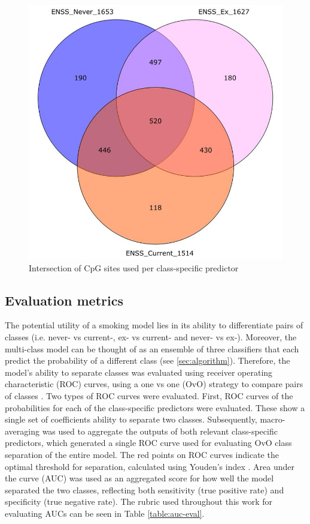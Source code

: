 \documentclass{article} %
\begin{document}
\begin{figure}[tb]
    \centering
    \includegraphics[width=0.6\linewidth]{venn_diagrams/predictor_intersect_placeholder.png}
    \caption[Model CpG site intersections]{Intersection of CpG sites used per class-specific predictor}
    \label{fig:cpg-intersection-internal}
\end{figure}

\subsection{Evaluation metrics}
The potential utility of a smoking model lies in its ability to differentiate pairs of classes (i.e. never- vs current-, ex- vs current- and never- vs ex-). Moreover, the multi-class model can be thought of as an ensemble of three classifiers that each predict the probability of a different class (see \ref{sec:algorithm}). Therefore, the model's ability to separate classes was evaluated using receiver operating characteristic (ROC) curves, using a one vs one (OvO) strategy to compare pairs of classes \cite{scikit-learn-roc-example}. Two types of ROC curves were evaluated. First, ROC curves of the probabilities for each of the class-specific predictors were evaluated. These show a single set of coefficients ability to separate two classes. Subsequently, macro-averaging \cite{scikit-learn-roc-example} was used to aggregate the outputs of both relevant class-specific predictors, which generated a single ROC curve used for evaluating OvO class separation of the entire model.
The red points on ROC curves indicate the optimal threshold for separation, calculated using Youden's index \cite{youden1950index}. Area under the curve (AUC) was used as an aggregated score for how well the model separated the two classes, reflecting both sensitivity (true positive rate) and specificity (true negative rate). The rubric used throughout this work for evaluating AUCs can be seen in Table \ref{table:auc-eval}.
\end{document}
